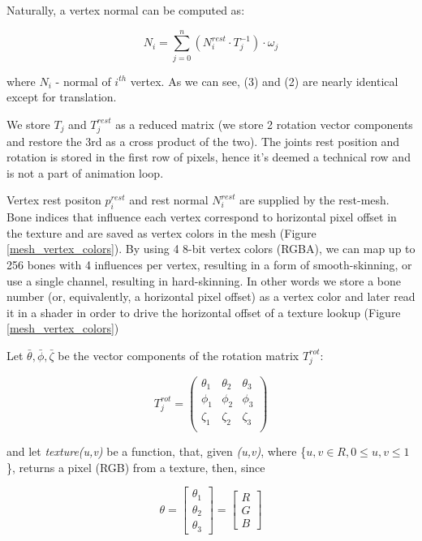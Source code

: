 \documentclass{acmsiggraph}
\begin{document}
Naturally, a vertex normal can be computed as:

\begin{equation}
  N_i = \sum^n_{j=0} ( N^{rest}_i \cdot T^{-1}_j) \cdot \omega_j
\end{equation}

where $N_i$ - normal of $i^{th}$ vertex. As we can see, (3) and (2) are nearly identical except for translation.

We store $T_j$ and $T^{rest}_j$ as a reduced matrix (we store 2 rotation vector components and restore the 3rd as a cross product of the two).  The joints rest position and rotation is stored in the first row of pixels, hence it's deemed a technical row and is not a part of animation loop. %

Vertex rest positon $p^{rest}_i$ and rest normal $N^{rest}_i$ are supplied by the rest-mesh.  Bone indices that influence each vertex correspond to horizontal pixel offset in the texture and are saved as vertex colors in the mesh (Figure \ref{mesh_vertex_colors}).  By using 4 8-bit vertex colors (RGBA), we can map up to 256 bones with 4 influences per vertex, resulting in a form of smooth-skinning, or use a single channel, resulting in hard-skinning.  In other words we store a bone number (or, equivalently, a horizontal pixel offset) as a vertex color and later read it in a shader in order to drive the horizontal offset of a texture lookup (Figure \ref{mesh_vertex_colors})

Let $\bar\theta, \bar\phi, \bar\zeta$ be the vector components of the rotation matrix $T^{rot}_j$:

\begin{equation} 
  T^{rot}_j =
  \begin{pmatrix}
    \theta_1 & \theta_2 & \theta_3 \\
    \phi_1   & \phi_2   & \phi_3 \\
    \zeta_1  & \zeta_2  & \zeta_3 \\
  \end{pmatrix}
\end{equation}

and let \textit{texture(u,v)} be a function, that, given \textit{(u,v)}, where \{$ u,v \in R, {0\leq u,v \leq 1}$\}, returns a pixel (RGB) from a texture, then, since

\begin{equation} 
  \theta =
  \begin{bmatrix}
    \theta_1 \\
    \theta_2 \\
    \theta_3
  \end{bmatrix}
  =
  \begin{bmatrix}
    R \\
    G \\
    B
  \end{bmatrix}
\end{equation}
\end{document}
